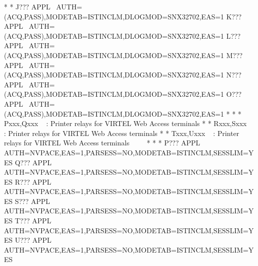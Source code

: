 \documentclass[letterpaper,10pt,english]{sphinxmanual}
\begin{document}
\begin{sphinxVerbatim}[commandchars=\\\{\}]
* \PYGZhy{}\PYGZhy{}\PYGZhy{}\PYGZhy{}\PYGZhy{}\PYGZhy{}\PYGZhy{}\PYGZhy{}\PYGZhy{}\PYGZhy{}\PYGZhy{}\PYGZhy{}\PYGZhy{}\PYGZhy{}\PYGZhy{}\PYGZhy{}\PYGZhy{}\PYGZhy{}\PYGZhy{}\PYGZhy{}\PYGZhy{}\PYGZhy{}\PYGZhy{}\PYGZhy{}\PYGZhy{}\PYGZhy{}\PYGZhy{}\PYGZhy{}\PYGZhy{}\PYGZhy{}\PYGZhy{}\PYGZhy{}\PYGZhy{}\PYGZhy{}\PYGZhy{}\PYGZhy{}\PYGZhy{}\PYGZhy{}\PYGZhy{}\PYGZhy{}\PYGZhy{}\PYGZhy{}\PYGZhy{}\PYGZhy{}\PYGZhy{}\PYGZhy{}\PYGZhy{}\PYGZhy{}\PYGZhy{}\PYGZhy{}\PYGZhy{}\PYGZhy{}\PYGZhy{}\PYGZhy{}\PYGZhy{}\PYGZhy{}\PYGZhy{}\PYGZhy{}\PYGZhy{}\PYGZhy{}\PYGZhy{}\PYGZhy{}\PYGZhy{}\PYGZhy{}\PYGZhy{}\PYGZhy{}*
J??? APPL  AUTH=(ACQ,PASS),MODETAB=ISTINCLM,DLOGMOD=SNX32702,EAS=1
K??? APPL  AUTH=(ACQ,PASS),MODETAB=ISTINCLM,DLOGMOD=SNX32702,EAS=1
L??? APPL  AUTH=(ACQ,PASS),MODETAB=ISTINCLM,DLOGMOD=SNX32702,EAS=1
M??? APPL  AUTH=(ACQ,PASS),MODETAB=ISTINCLM,DLOGMOD=SNX32702,EAS=1
N??? APPL  AUTH=(ACQ,PASS),MODETAB=ISTINCLM,DLOGMOD=SNX32702,EAS=1
O??? APPL  AUTH=(ACQ,PASS),MODETAB=ISTINCLM,DLOGMOD=SNX32702,EAS=1
* \PYGZhy{}\PYGZhy{}\PYGZhy{}\PYGZhy{}\PYGZhy{}\PYGZhy{}\PYGZhy{}\PYGZhy{}\PYGZhy{}\PYGZhy{}\PYGZhy{}\PYGZhy{}\PYGZhy{}\PYGZhy{}\PYGZhy{}\PYGZhy{}\PYGZhy{}\PYGZhy{}\PYGZhy{}\PYGZhy{}\PYGZhy{}\PYGZhy{}\PYGZhy{}\PYGZhy{}\PYGZhy{}\PYGZhy{}\PYGZhy{}\PYGZhy{}\PYGZhy{}\PYGZhy{}\PYGZhy{}\PYGZhy{}\PYGZhy{}\PYGZhy{}\PYGZhy{}\PYGZhy{}\PYGZhy{}\PYGZhy{}\PYGZhy{}\PYGZhy{}\PYGZhy{}\PYGZhy{}\PYGZhy{}\PYGZhy{}\PYGZhy{}\PYGZhy{}\PYGZhy{}\PYGZhy{}\PYGZhy{}\PYGZhy{}\PYGZhy{}\PYGZhy{}\PYGZhy{}\PYGZhy{}\PYGZhy{}\PYGZhy{}\PYGZhy{}\PYGZhy{}\PYGZhy{}\PYGZhy{}\PYGZhy{}\PYGZhy{}\PYGZhy{}\PYGZhy{}\PYGZhy{}\PYGZhy{}*
* Pxxx,Qxxx   : Printer relays for VIRTEL Web Access terminals      *
* Rxxx,Sxxx   : Printer relays for VIRTEL Web Access terminals      *
* Txxx,Uxxx   : Printer relays for VIRTEL Web Access terminals      *
* \PYGZhy{}\PYGZhy{}\PYGZhy{}\PYGZhy{}\PYGZhy{}\PYGZhy{}\PYGZhy{}\PYGZhy{}\PYGZhy{}\PYGZhy{}\PYGZhy{}\PYGZhy{}\PYGZhy{}\PYGZhy{}\PYGZhy{}\PYGZhy{}\PYGZhy{}\PYGZhy{}\PYGZhy{}\PYGZhy{}\PYGZhy{}\PYGZhy{}\PYGZhy{}\PYGZhy{}\PYGZhy{}\PYGZhy{}\PYGZhy{}\PYGZhy{}\PYGZhy{}\PYGZhy{}\PYGZhy{}\PYGZhy{}\PYGZhy{}\PYGZhy{}\PYGZhy{}\PYGZhy{}\PYGZhy{}\PYGZhy{}\PYGZhy{}\PYGZhy{}\PYGZhy{}\PYGZhy{}\PYGZhy{}\PYGZhy{}\PYGZhy{}\PYGZhy{}\PYGZhy{}\PYGZhy{}\PYGZhy{}\PYGZhy{}\PYGZhy{}\PYGZhy{}\PYGZhy{}\PYGZhy{}\PYGZhy{}\PYGZhy{}\PYGZhy{}\PYGZhy{}\PYGZhy{}\PYGZhy{}\PYGZhy{}\PYGZhy{}\PYGZhy{}\PYGZhy{}\PYGZhy{}\PYGZhy{}*
P??? APPL AUTH=NVPACE,EAS=1,PARSESS=NO,MODETAB=ISTINCLM,SESSLIM=YES
Q??? APPL AUTH=NVPACE,EAS=1,PARSESS=NO,MODETAB=ISTINCLM,SESSLIM=YES
R??? APPL AUTH=NVPACE,EAS=1,PARSESS=NO,MODETAB=ISTINCLM,SESSLIM=YES
S??? APPL AUTH=NVPACE,EAS=1,PARSESS=NO,MODETAB=ISTINCLM,SESSLIM=YES
T??? APPL AUTH=NVPACE,EAS=1,PARSESS=NO,MODETAB=ISTINCLM,SESSLIM=YES
U??? APPL AUTH=NVPACE,EAS=1,PARSESS=NO,MODETAB=ISTINCLM,SESSLIM=YES
\end{sphinxVerbatim}
\end{document}
